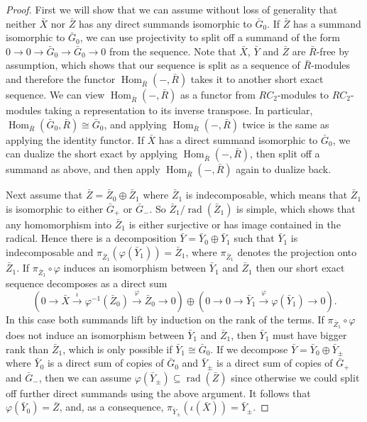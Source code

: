 \documentclass[11pt, a4paper]{amsart}
\theoremstyle{definition}
\theoremstyle{definition}
\newcommand{\Hom}{\operatorname{Hom}}
\newcommand{\rad}{\operatorname{rad}}
\begin{document}
\begin{proof}
    First we will show that we can assume without loss of generality that neither $\bar X$ nor $\bar Z$ has any direct summands isomorphic to $\bar G_0$. If $\bar Z$ has a summand isomorphic to $\bar G_0$, we can use projectivity to split off a summand of the form $0\longrightarrow 0 \longrightarrow \bar G_0 \longrightarrow \bar G_0 \longrightarrow 0$ from the sequence. 
    Note that $\bar X$, $\bar Y$ and $\bar Z$ are $\bar R$-free by assumption, which shows that our sequence is split as a sequence of $\bar R$-modules and therefore the functor $\Hom_{\bar R}(-,\bar R)$ takes it to another short exact sequence. We can view $\Hom_{\bar R}(-,\bar R)$ as a functor from $RC_2$-modules to $RC_2$-modules taking a representation to its inverse transpose. In particular, $\Hom_{\bar R}(\bar G_0, \bar R)\cong \bar G_0$, and applying $\Hom_{\bar R}(-,\bar R)$ twice is the same as applying the identity functor.
    If $\bar X$ has a direct summand isomorphic to $\bar G_0$, we can dualize the short exact by applying $\Hom_{\bar R}(-,\bar R)$, then split off a summand as above, and then apply $\Hom_{\bar R}(-,\bar R)$ again to dualize back.

    Next assume that $\bar Z=\bar Z_0\oplus \bar Z_1$ where $\bar Z_1$ is indecomposable, which means that $\bar Z_1$ is isomorphic to either $\bar G_+$ or $\bar G_-$. So $\bar Z_1/\rad(\bar Z_1)$ is simple, which shows that any homomorphism into $\bar Z_1$ is either surjective or has image contained in the radical. Hence there is a decomposition $\bar Y=\bar Y_0\oplus \bar Y_1$ such that $\bar Y_1$ is indecomposable and $\pi_{\bar Z_1}(\varphi(\bar Y_1))=\bar Z_1$, where $\pi_{\bar Z_1}$ denotes the projection onto $\bar Z_1$. If $\pi_{\bar Z_1}\circ \varphi$ induces an isomorphism between $\bar Y_1$ and $\bar Z_1$ then our short exact sequence decomposes as a direct sum
    \begin{equation}
    \left (        0\longrightarrow \bar X \stackrel{\iota}{\longrightarrow} \varphi^{-1}(\bar Z_0) \stackrel{\varphi}{\longrightarrow} \bar Z_0 \longrightarrow 0 \right )\oplus \left(         0\longrightarrow 0  \longrightarrow \bar Y_1 \stackrel{\varphi}{\longrightarrow} \varphi(\bar Y_1) \longrightarrow 0 \right).
    \end{equation}
    In this case both summands lift by induction on the rank of the terms. If $\pi_{\bar Z_1}\circ \varphi$  does not induce an isomorphism between $\bar Y_1$ and $\bar Z_1$, then $\bar Y_1$ must have bigger rank than $\bar Z_1$, which is only possible if $\bar Y_1\cong \bar G_0$.  If we decompose $\bar Y=\bar Y_0\oplus \bar Y_{\pm}$ where $\bar Y_0$ is a direct sum of copies of $\bar G_0$ and $\bar Y_\pm$ is a direct sum of copies of $\bar{G}_+$ and $\bar{G}_-$, then we can assume $\varphi(\bar Y_{\pm})\subseteq \rad(\bar Z)$ since otherwise we could split off further direct summands using the above argument. It follows that $\varphi(\bar Y_0)=\bar Z$, and, as a consequence,  $\pi_{\bar Y_\pm}(\iota(\bar X))=\bar Y_{\pm}$. 
    

\end{proof}
\end{document}
